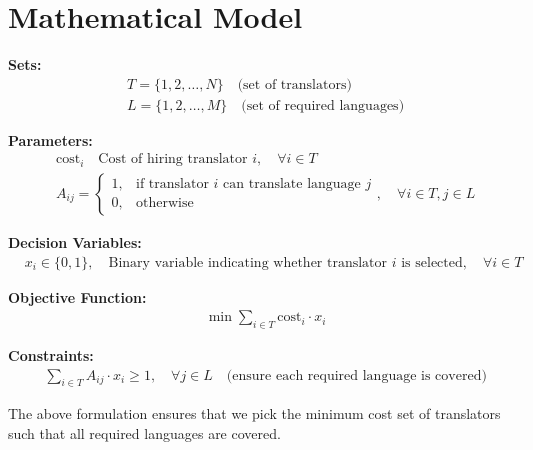 \documentclass{article}
\begin{document}
\section*{Mathematical Model}

\textbf{Sets:}
\begin{align*}
  & T = \{1, 2, \ldots, N\} \quad \text{(set of translators)} \\
  & L = \{1, 2, \ldots, M\} \quad \text{(set of required languages)}
\end{align*}

\textbf{Parameters:}
\begin{align*}
  & \text{cost}_i \quad \text{Cost of hiring translator } i, \quad \forall i \in T \\
  & A_{ij} = 
  \begin{cases} 
    1, & \text{if translator } i \text{ can translate language } j \\ 
    0, & \text{otherwise}
  \end{cases}, \quad \forall i \in T, j \in L
\end{align*}

\textbf{Decision Variables:}
\begin{align*}
  & x_i \in \{0, 1\}, \quad \text{Binary variable indicating whether translator } i \text{ is selected}, \quad \forall i \in T
\end{align*}

\textbf{Objective Function:}
\begin{align*}
  & \min \sum_{i \in T} \text{cost}_i \cdot x_i
\end{align*}

\textbf{Constraints:}
\begin{align*}
  & \sum_{i \in T} A_{ij} \cdot x_i \geq 1, \quad \forall j \in L \quad \text{(ensure each required language is covered)}
\end{align*}

The above formulation ensures that we pick the minimum cost set of translators such that all required languages are covered.
\end{document}
